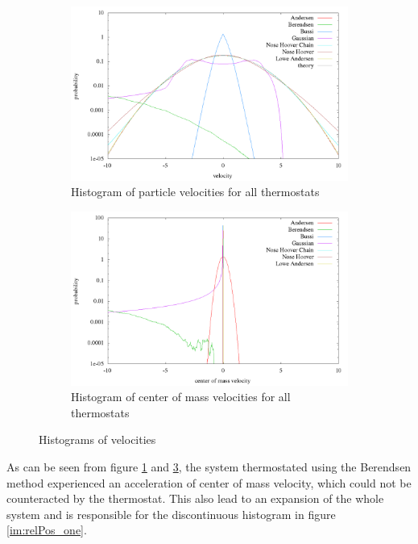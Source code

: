 \begin{figure}[H]
\centering
  \begin{subfigure}[b]{0.5\textwidth}
  	\includegraphics[width=\linewidth]{./graphics/Histogramm_velocity_one_T=20_p=64.png}
  	\caption{Histogram of particle velocities for all thermostats}
    \label{im:vel_one}
  \end{subfigure}\hfill
  \begin{subfigure}[b]{0.5\textwidth}
    \includegraphics[width=\linewidth]{./graphics/Histogramm_schwerVel_one_T=20_p=64.png}
    \caption{Histogram of center of mass velocities for all thermostats}
    \label{im:schwerVel_one} 
  \end{subfigure}
  \caption{Histograms of velocities}
\end{figure}

As can be seen from figure \ref{im:vel_one} and \ref{im:schwerVel_one}, the system thermostated using the Berendsen method experienced an acceleration of center of mass velocity, which could not be counteracted by the thermostat. This also lead to an expansion of the whole system and is responsible for the discontinuous histogram in figure \ref{im:relPos_one}.

